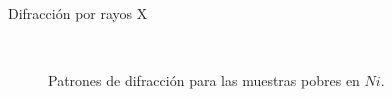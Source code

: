 \documentclass[11pt]{beamer}
\begin{document}
\begin{frame}{Difracción por rayos X}
\begin{figure}[H]
					 \\
					\caption*{Patrones de difracción para las muestras pobres en $Ni$.}
					\label{RXNiPoor}
				\end{figure}		
			\end{frame}
			
\end{document}
